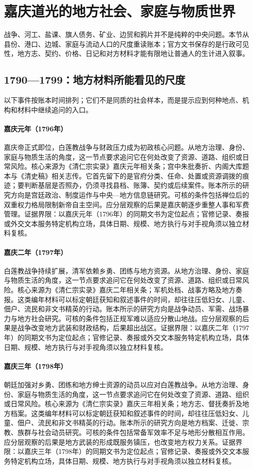 \section{嘉庆道光的地方社会、家庭与物质世界}
战争、河工、盐课、旗人债务、矿业、边贸和鸦片并不是纯粹的中央问题。本节从县份、港口、边城、家庭与流动人口的尺度重读账本；官方文书保存的是行政可见性，地方志、契约、价格、日记和对方材料才能有限地让普通人的生计进入叙事。
\subsection{1790—1799：地方材料所能看见的尺度}
以下事件按账本时间排列；它们不是同质的社会样本，而是提示应到何种地点、机构和材料中继续追问的入口。
\hypertarget{social:EQ-1796-JIAQING-ACCESSION}{}\paragraph{嘉庆元年（1796年）}嘉庆帝正式即位，白莲教战争与财政压力成为初政核心问题。从地方治理、身份、家庭与物质生活的角度，这一节点要求追问它在何处改变了资源、道路、组织或日常风险。核心来源为《清仁宗实录》嘉庆元年相关条；宫中朱批奏折、内阁大库题本与《清史稿》相关志传。它首先留下的是官府分类、任命、处置或资源调拨的痕迹；要判断基层是否照办，仍须寻找县档、账簿、契约或后续案件。账本所示的研究方向是宫廷政治、制度运作与中央—地方信息链研究。可核的条件包括禅位后的双重权力格局限制新帝自主空间。应分层观察的后果是嘉庆朝逐步重整人事和军费管理。证据界限：以嘉庆元年（1796年）的同期文书为定位起点；官修记录、奏报或外交文本服务特定机构立场，具体日期、规模、地方执行与对手视角须以独立材料复核。
\hypertarget{social:EQ-1797-WHITE-LOTUS-WAR}{}\paragraph{嘉庆二年（1797年）}白莲教战争持续扩展，清军依赖乡勇、团练与地方资源。从地方治理、身份、家庭与物质生活的角度，这一节点要求追问它在何处改变了资源、道路、组织或日常风险。核心来源为《清仁宗实录》嘉庆二年相关条；军机处档、战事方略及地方奏报。这类编年材料可以标定朝廷获知和叙述事件的时间，却往往压低妇女、儿童、佃户、流民和非文书精英的行动。账本所示的研究方向是战争动员、军需、战场暴力与地方社会研究。可核的条件包括正规军难以适应分散山地战。应分层观察的后果是战争改变地方武装和财政结构，后果超出战区。证据界限：以嘉庆二年（1797年）的同期文书为定位起点；官修记录、奏报或外交文本服务特定机构立场，具体日期、规模、地方执行与对手视角须以独立材料复核。
\hypertarget{social:EQ-1798-MILITIA-MOBILIZATION}{}\paragraph{嘉庆三年（1798年）}朝廷加强对乡勇、团练和地方绅士资源的动员以应对白莲教战争。从地方治理、身份、家庭与物质生活的角度，这一节点要求追问它在何处改变了资源、道路、组织或日常风险。核心来源为《清仁宗实录》嘉庆三年相关条；地方志、督抚奏折及地方档案。这类编年材料可以标定朝廷获知和叙述事件的时间，却往往压低妇女、儿童、佃户、流民和非文书精英的行动。账本所示的研究方向是地方档案、迁徙、宗教、族群与社会动员研究。可核的条件包括常备军效率不足与地形分散相互作用。应分层观察的后果是地方武装的形成既服务镇压，也改变地方权力关系。证据界限：以嘉庆三年（1798年）的同期文书为定位起点；官修记录、奏报或外交文本服务特定机构立场，具体日期、规模、地方执行与对手视角须以独立材料复核。
